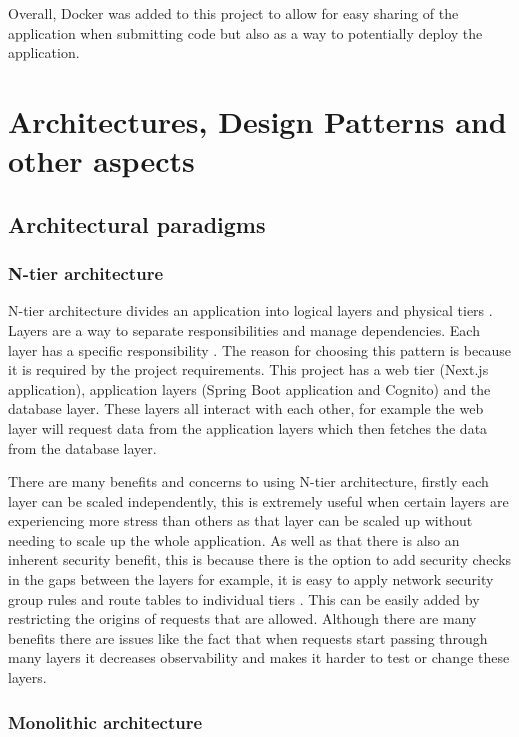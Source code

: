 \documentclass[]{project_report}
\begin{document}
Overall, Docker was added to this project to allow for easy sharing of the application when submitting code but also as a way to potentially deploy the application.

\chapter{Architectures, Design Patterns and other aspects}

\section{Architectural paradigms}

\subsection{N-tier architecture}

N-tier architecture divides an application into logical layers and physical tiers \cite{n_tier_architecture}. Layers are a way to separate responsibilities and manage dependencies. Each layer has a specific responsibility \cite{n_tier_architecture}. The reason for choosing this pattern is because it is required by the project requirements. This project has a web tier (Next.js application), application layers (Spring Boot application and Cognito) and the database layer. These layers all interact with each other, for example the web layer will request data from the application layers which then fetches the data from the database layer. 

There are many benefits and concerns to using N-tier architecture, firstly each layer can be scaled independently, this is extremely useful when certain layers are experiencing more stress than others as that layer can be scaled up without needing to scale up the whole application. As well as that there is also an inherent security benefit, this is because there is the option to add security checks in the gaps between the layers for example, it is easy to apply network security group rules and route tables to individual tiers \cite{n_tier_architecture}. This can be easily added by restricting the origins of requests that are allowed. Although there are many benefits there are issues like the fact that when requests start passing through many layers it decreases observability and makes it harder to test or change these layers.

\subsection{Monolithic architecture}
\end{document}
